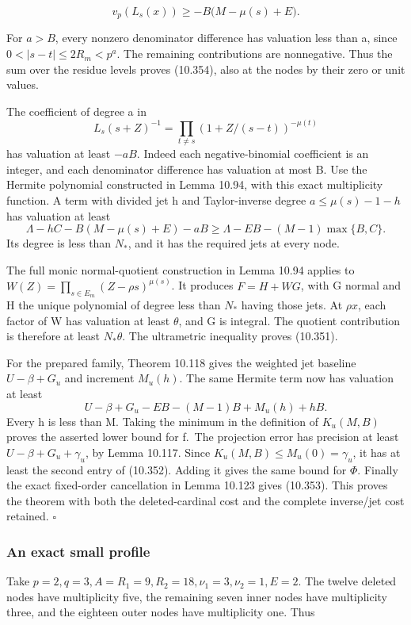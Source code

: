 \documentclass[
  11pt,
  a4paper,
]{article}
\begin{document}
\[
v_p(L_s(x))\ge-B\bigl(M-\mu(s)+E\bigr).
\tag{10.354}
\]

For \(a>B\), every nonzero denominator difference has valuation less
than a, since \(0<|s-t|\le2R_m<p^a\). The remaining contributions are
nonnegative. Thus the sum over the residue levels proves (10.354), also
at the nodes by their zero or unit values.

The coefficient of degree a in \[
L_s(s+Z)^{-1}
=\prod_{t\ne s}(1+Z/(s-t))^{-\mu(t)}
\] has valuation at least \(-aB\). Indeed each negative-binomial
coefficient is an integer, and each denominator difference has valuation
at most B. Use the Hermite polynomial constructed in Lemma 10.94, with
this exact multiplicity function. A term with divided jet h and
Taylor-inverse degree \(a\le\mu(s)-1-h\) has valuation at least \[
\Lambda-hC-B(M-\mu(s)+E)-aB
\ge\Lambda-EB-(M-1)\max\{B,C\}.
\] Its degree is less than \(N_*\), and it has the required jets at
every node.

The full monic normal-quotient construction in Lemma 10.94 applies to
\(W(Z)=\prod_{s\in E_m}(Z-\rho s)^{\mu(s)}\). It produces \(F=H+WG\),
with G normal and H the unique polynomial of degree less than \(N_*\)
having those jets. At \(\rho x\), each factor of W has valuation at
least \(\theta\), and G is integral. The quotient contribution is
therefore at least \(N_*\theta\). The ultrametric inequality proves
(10.351).

For the prepared family, Theorem 10.118 gives the weighted jet baseline
\(U-\beta+G_u\) and increment \(M_u(h)\). The same Hermite term now has
valuation at least \[
U-\beta+G_u-EB-(M-1)B+M_u(h)+hB.
\] Every h is less than M. Taking the minimum in the definition of
\(K_u(M,B)\) proves the asserted lower bound for f.~The projection error
has precision at least \(U-\beta+G_u+\gamma_u\), by Lemma 10.117. Since
\(K_u(M,B)\le M_u(0)=\gamma_u\), it has at least the second entry of
(10.352). Adding it gives the same bound for \(\Phi\). Finally the exact
fixed-order cancellation in Lemma 10.123 gives (10.353). This proves the
theorem with both the deleted-cardinal cost and the complete inverse/jet
cost retained. \(\square\)

\subsubsection{An exact small profile}\label{an-exact-small-profile}

Take \(p=2,q=3,A=R_1=9,R_2=18,\nu_1=3,\nu_2=1,E=2\). The twelve deleted
nodes have multiplicity five, the remaining seven inner nodes have
multiplicity three, and the eighteen outer nodes have multiplicity one.
Thus
\end{document}
